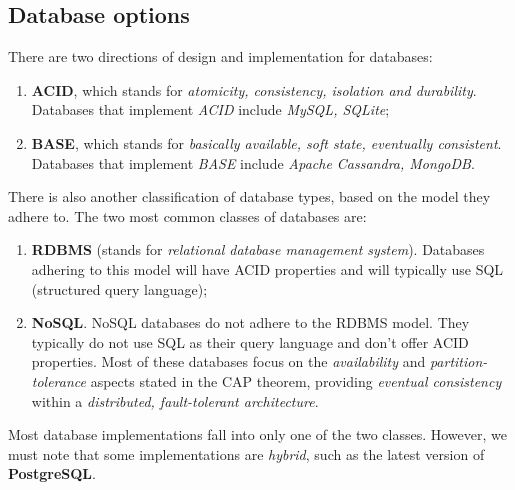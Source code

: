 \documentclass[a4paper,onecolumn,oneside,titlepage,11pt]{report}
\begin{document}
	\subsection{Database options}
	There are two directions of design and implementation for databases:
	\begin{enumerate}
		\item \textbf{ACID}, which stands for \emph{atomicity, consistency, isolation and durability}. Databases that implement \emph{ACID} include \emph{MySQL, SQLite};
		\item \textbf{BASE}, which stands for \emph{basically available, soft state, eventually consistent}. Databases that implement \emph{BASE} include \emph{Apache Cassandra, MongoDB}.
	\end{enumerate}
	There is also another classification of database types, based on the model they adhere to. The two most common classes of databases are:
	\begin{enumerate}
		\item \textbf{RDBMS} (stands for \emph{relational database management system}). Databases adhering to this model will have ACID properties and will typically use SQL (structured query language);
		\item \textbf{NoSQL}. NoSQL databases do not adhere to the RDBMS model. They typically do not use SQL as their query language and don't offer ACID properties. Most of these databases focus on the \emph{availability} and \emph{partition-tolerance} aspects stated in the CAP theorem, providing \emph{eventual consistency} within a \emph{distributed, fault-tolerant architecture}.
	\end{enumerate}
	
	Most database implementations fall into only one of the two classes. However, we must note that some implementations are \emph{hybrid}, such as the latest version of \textbf{PostgreSQL}.
	
\end{document}
